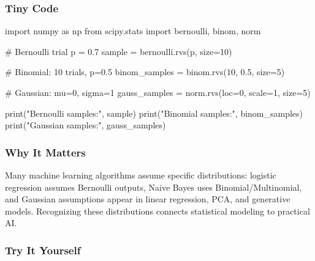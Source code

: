 \documentclass[
  letterpaper,
  DIV=11,
  numbers=noendperiod]{scrreprt}
\newenvironment{Shaded}{\begin{snugshade}}{\end{snugshade}}
\newcommand{\BuiltInTok}[1]{\textcolor[rgb]{0.00,0.23,0.31}{#1}}
\newcommand{\CommentTok}[1]{\textcolor[rgb]{0.37,0.37,0.37}{#1}}
\newcommand{\DecValTok}[1]{\textcolor[rgb]{0.68,0.00,0.00}{#1}}
\newcommand{\FloatTok}[1]{\textcolor[rgb]{0.68,0.00,0.00}{#1}}
\newcommand{\ImportTok}[1]{\textcolor[rgb]{0.00,0.46,0.62}{#1}}
\newcommand{\NormalTok}[1]{\textcolor[rgb]{0.00,0.23,0.31}{#1}}
\newcommand{\OperatorTok}[1]{\textcolor[rgb]{0.37,0.37,0.37}{#1}}
\newcommand{\StringTok}[1]{\textcolor[rgb]{0.13,0.47,0.30}{#1}}
\begin{document}
\subsubsection{Tiny Code}\label{tiny-code-123}

\begin{Shaded}
\begin{Highlighting}[]
\ImportTok{import}\NormalTok{ numpy }\ImportTok{as}\NormalTok{ np}
\ImportTok{from}\NormalTok{ scipy.stats }\ImportTok{import}\NormalTok{ bernoulli, binom, norm}

\CommentTok{\# Bernoulli trial}
\NormalTok{p }\OperatorTok{=} \FloatTok{0.7}
\NormalTok{sample }\OperatorTok{=}\NormalTok{ bernoulli.rvs(p, size}\OperatorTok{=}\DecValTok{10}\NormalTok{)}

\CommentTok{\# Binomial: 10 trials, p=0.5}
\NormalTok{binom\_samples }\OperatorTok{=}\NormalTok{ binom.rvs(}\DecValTok{10}\NormalTok{, }\FloatTok{0.5}\NormalTok{, size}\OperatorTok{=}\DecValTok{5}\NormalTok{)}

\CommentTok{\# Gaussian: mu=0, sigma=1}
\NormalTok{gauss\_samples }\OperatorTok{=}\NormalTok{ norm.rvs(loc}\OperatorTok{=}\DecValTok{0}\NormalTok{, scale}\OperatorTok{=}\DecValTok{1}\NormalTok{, size}\OperatorTok{=}\DecValTok{5}\NormalTok{)}

\BuiltInTok{print}\NormalTok{(}\StringTok{"Bernoulli samples:"}\NormalTok{, sample)}
\BuiltInTok{print}\NormalTok{(}\StringTok{"Binomial samples:"}\NormalTok{, binom\_samples)}
\BuiltInTok{print}\NormalTok{(}\StringTok{"Gaussian samples:"}\NormalTok{, gauss\_samples)}
\end{Highlighting}
\end{Shaded}

\subsubsection{Why It Matters}\label{why-it-matters-21}

Many machine learning algorithms assume specific distributions: logistic
regression assumes Bernoulli outputs, Naive Bayes uses
Binomial/Multinomial, and Gaussian assumptions appear in linear
regression, PCA, and generative models. Recognizing these distributions
connects statistical modeling to practical AI.

\subsubsection{Try It Yourself}\label{try-it-yourself-123}
\end{document}
